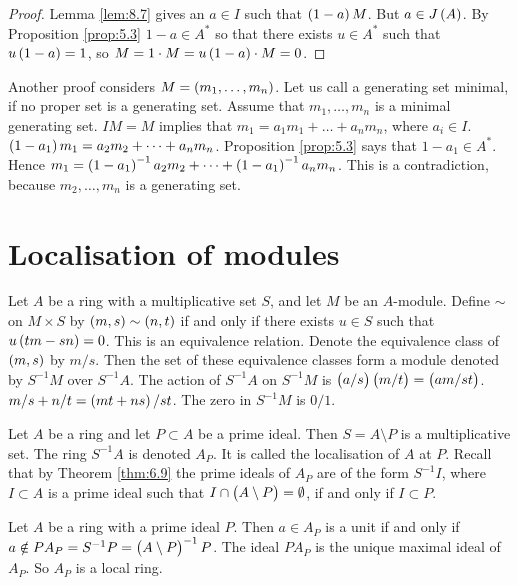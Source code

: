 \begin{proof}
Lemma \ref{lem:8.7} gives an $ a \in I $ such that $ \br{1 - a}M $. But $ a \in J\br{A} $. By Proposition \ref{prop:5.3} $ 1 - a \in A^* $ so that there exists $ u \in A^* $ such that $ u\br{1 - a} = 1 $, so $ M = 1 \cdot M = u\br{1 - a} \cdot M = 0 $.
\end{proof}

Another proof considers $ M = \br{m_1, \dots, m_n} $. Let us call a generating set minimal, if no proper set is a generating set. Assume that $ m_1, \dots, m_n $ is a minimal generating set. $ IM = M $ implies that $ m_1 = a_1m_1 + \dots + a_nm_n $, where $ a_i \in I $. $ \br{1 - a_1}m_1 = a_2m_2 + \dots + a_nm_n $. Proposition \ref{prop:5.3} says that $ 1 - a_1 \in A^* $. Hence $ m_1 = \br{1 - a_1}^{-1}a_2m_2 + \dots + \br{1 - a_1}^{-1}a_nm_n $. This is a contradiction, because $ m_2, \dots, m_n $ is a generating set.

\pagebreak

\section{Localisation of modules}

\begin{definition}
Let $ A $ be a ring with a multiplicative set $ S $, and let $ M $ be an $ A $-module. Define $ \sim $ on $ M \times S $ by $ \br{m, s} \sim \br{n, t} $ if and only if there exists $ u \in S $ such that $ u\br{tm - sn} = 0 $. This is an equivalence relation. Denote the equivalence class of $ \br{m, s} $ by $ m / s $. Then the set of these equivalence classes form a module denoted by $ S^{-1}M $ over $ S^{-1}A $. The action of $ S^{-1}A $ on $ S^{-1}M $ is $ \br{a / s}\br{m / t} = \br{am / st} $. $ m / s + n / t = \br{mt + ns} / st $. The zero in $ S^{-1}M $ is $ 0 / 1 $.
\end{definition}

\begin{definition}
Let $ A $ be a ring and let $ P \subset A $ be a prime ideal. Then $ S = A \setminus P $ is a multiplicative set. The ring $ S^{-1}A $ is denoted $ A_P $. It is called the localisation of $ A $ at $ P $. Recall that by Theorem \ref{thm:6.9} the prime ideals of $ A_P $ are of the form $ S^{-1}I $, where $ I \subset A $ is a prime ideal such that $ I \cap \br{A \setminus P} = \emptyset $, if and only if $ I \subset P $.
\end{definition}

\begin{theorem}
Let $ A $ be a ring with a prime ideal $ P $. Then $ a \in A_P $ is a unit if and only if $ a \notin PA_P = S^{-1}P = \br{A \setminus P}^{-1}P $. The ideal $ PA_P $ is the unique maximal ideal of $ A_P $. So $ A_P $ is a local ring.
\end{theorem}

